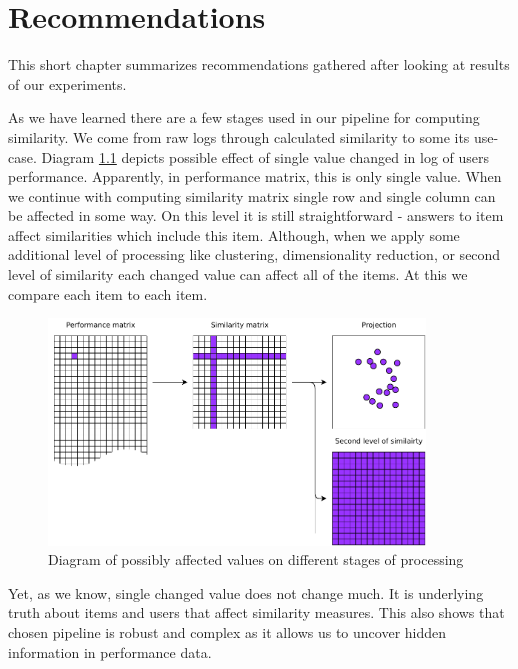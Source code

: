 \documentclass[
  digital, %
  table,   %
  nolof,     %
  nolot,     %
  nocover,
  color
]{fithesis3}
\begin{document}
\chapter{Recommendations}\label{recommendations}



This short chapter summarizes recommendations gathered after looking at results of our experiments.


As we have learned there are a few stages used in our pipeline for computing similarity. We come from raw logs through calculated similarity to some its use-case. Diagram \ref{fig:affected_diagram} depicts possible effect of single value changed in log of users performance. Apparently, in performance matrix, this is only single value. When we continue with computing similarity matrix single row and single column can be affected in some way. On this level it is still straightforward - answers to item affect similarities which include this item. Although, when we apply some additional level of processing like clustering, dimensionality reduction, or second level of similarity each changed value can affect all of the items. At this we compare each item to each item.

\begin{figure}
  \includegraphics[width=10cm]{img/affected_diagram}
  \caption{Diagram of possibly affected values on different stages of processing}
  \label{fig:affected_diagram}
\end{figure}

Yet, as we know, single changed value does not change much. It is underlying truth about items and users that affect similarity measures. This also shows that chosen pipeline is robust and complex as it allows us to uncover hidden information in performance data.
\end{document}
